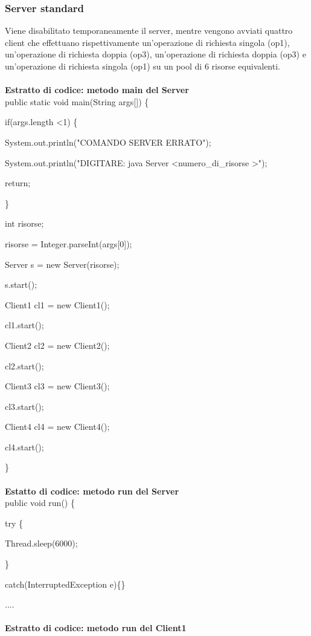 \documentclass[10pt, a4paper]{article}
\begin{document}
\subsubsection{Server standard}
Viene disabilitato temporaneamente il server, mentre vengono avviati quattro client che effettuano rispettivamente un'operazione di richiesta singola (op1), un'operazione di richiesta doppia (op3), un'operazione di richiesta doppia (op3) e un'operazione di richiesta singola (op1) su un pool di 6 risorse equivalenti.
\\\\
\textbf{Estratto di codice: metodo main del Server}
\\

public static void main(String args[]) \{

        if(args.length \textless 1) \{

            System.out.println("COMANDO SERVER ERRATO");

            System.out.println("DIGITARE: java Server \textless numero\_di\_risorse \textgreater");

            return;

        \}

        int risorse;

        risorse = Integer.parseInt(args[0]);

        Server s = new Server(risorse);

        s.start();

	Client1 cl1 = new Client1();

	cl1.start();

	Client2 cl2 = new Client2();

	cl2.start();

	Client3 cl3 = new Client3();

	cl3.start();

	Client4 cl4 = new Client4();

	cl4.start();

\}
\\\\
\textbf{Estatto di codice: metodo run del Server}
\\

public void run() \{

try \{ 

		Thread.sleep(6000);

	\}

	catch(InterruptedException e)\{\}

.... 
\\\\
\textbf{Estratto di codice: metodo run del Client1}
\\
\end{document}
